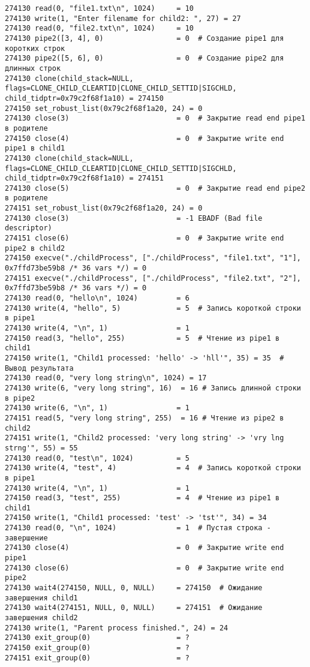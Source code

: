 \begin{verbatim}
274130 read(0, "file1.txt\n", 1024)     = 10
274130 write(1, "Enter filename for child2: ", 27) = 27
274130 read(0, "file2.txt\n", 1024)     = 10
274130 pipe2([3, 4], 0)                 = 0  # Создание pipe1 для коротких строк
274130 pipe2([5, 6], 0)                 = 0  # Создание pipe2 для длинных строк
274130 clone(child_stack=NULL, flags=CLONE_CHILD_CLEARTID|CLONE_CHILD_SETTID|SIGCHLD, child_tidptr=0x79c2f68f1a10) = 274150
274150 set_robust_list(0x79c2f68f1a20, 24) = 0
274130 close(3)                         = 0  # Закрытие read end pipe1 в родителе
274150 close(4)                         = 0  # Закрытие write end pipe1 в child1
274130 clone(child_stack=NULL, flags=CLONE_CHILD_CLEARTID|CLONE_CHILD_SETTID|SIGCHLD, child_tidptr=0x79c2f68f1a10) = 274151
274130 close(5)                         = 0  # Закрытие read end pipe2 в родителе
274151 set_robust_list(0x79c2f68f1a20, 24) = 0
274130 close(3)                         = -1 EBADF (Bad file descriptor)
274151 close(6)                         = 0  # Закрытие write end pipe2 в child2
274150 execve("./childProcess", ["./childProcess", "file1.txt", "1"], 0x7ffd73be59b8 /* 36 vars */) = 0
274151 execve("./childProcess", ["./childProcess", "file2.txt", "2"], 0x7ffd73be59b8 /* 36 vars */) = 0
274130 read(0, "hello\n", 1024)         = 6
274130 write(4, "hello", 5)             = 5  # Запись короткой строки в pipe1
274130 write(4, "\n", 1)                = 1
274150 read(3, "hello", 255)            = 5  # Чтение из pipe1 в child1
274150 write(1, "Child1 processed: 'hello' -> 'hll'", 35) = 35  # Вывод результата
274130 read(0, "very long string\n", 1024) = 17
274130 write(6, "very long string", 16)  = 16 # Запись длинной строки в pipe2
274130 write(6, "\n", 1)                = 1
274151 read(5, "very long string", 255)  = 16 # Чтение из pipe2 в child2
274151 write(1, "Child2 processed: 'very long string' -> 'vry lng strng'", 55) = 55
274130 read(0, "test\n", 1024)          = 5
274130 write(4, "test", 4)              = 4  # Запись короткой строки в pipe1
274130 write(4, "\n", 1)                = 1
274150 read(3, "test", 255)             = 4  # Чтение из pipe1 в child1
274150 write(1, "Child1 processed: 'test' -> 'tst'", 34) = 34
274130 read(0, "\n", 1024)              = 1  # Пустая строка - завершение
274130 close(4)                         = 0  # Закрытие write end pipe1
274130 close(6)                         = 0  # Закрытие write end pipe2
274130 wait4(274150, NULL, 0, NULL)     = 274150  # Ожидание завершения child1
274130 wait4(274151, NULL, 0, NULL)     = 274151  # Ожидание завершения child2
274130 write(1, "Parent process finished.", 24) = 24
274130 exit_group(0)                    = ?
274150 exit_group(0)                    = ?
274151 exit_group(0)                    = ?
\end{verbatim}

